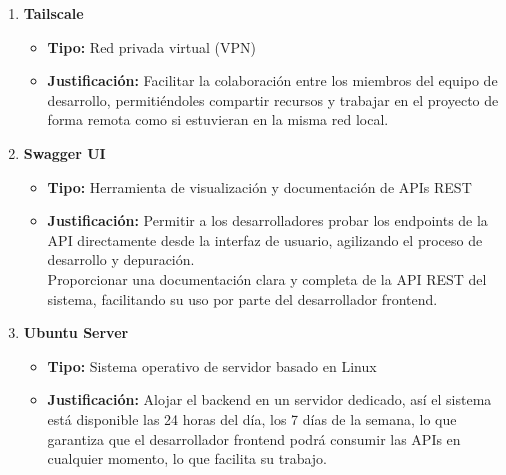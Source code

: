 \documentclass[12pt]{article} %
\begin{document}
\begin{enumerate}[font=\bfseries]
    \item \textbf{Tailscale}
    \begin{itemize}
        \item \textbf{Tipo:} Red privada virtual (VPN)
        \item \textbf{Justificación:} Facilitar la colaboración entre los miembros del equipo de desarrollo, permitiéndoles compartir recursos y trabajar en el proyecto de forma remota como si estuvieran en la misma red local.
    \end{itemize}
    
    \item \textbf{Swagger UI}
    \begin{itemize}
        \item \textbf{Tipo:} Herramienta de visualización y documentación de APIs REST
        \item \textbf{Justificación:} Permitir a los desarrolladores probar los endpoints de la API directamente desde la interfaz de usuario, agilizando el proceso de desarrollo y depuración. \\
        Proporcionar una documentación clara y completa de la API REST del sistema, facilitando su uso por parte del desarrollador frontend.
    \end{itemize}
    
    \item \textbf{Ubuntu Server}
    \begin{itemize}
        \item \textbf{Tipo:} Sistema operativo de servidor basado en Linux
        \item \textbf{Justificación:} Alojar el backend en un servidor dedicado, así el sistema está disponible las 24 horas del día, los 7 días de la semana, lo que garantiza que el desarrollador frontend podrá consumir las APIs en cualquier momento, lo que facilita su trabajo.
    \end{itemize}
\end{enumerate}
\end{document}
